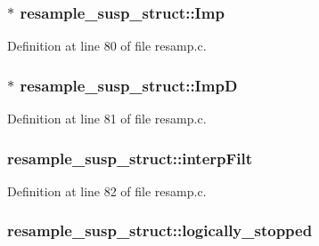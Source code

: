\subsubsection[{\texorpdfstring{Imp}{Imp}}]{$\ast$ resample\+\_\+susp\+\_\+struct\+::\+Imp}\hypertarget{structresample__susp__struct_aba6ac02376ae5614b4d20fd24f67c490}{}\label{structresample__susp__struct_aba6ac02376ae5614b4d20fd24f67c490}


Definition at line 80 of file resamp.\+c.

\subsubsection[{\texorpdfstring{ImpD}{ImpD}}]{$\ast$ resample\+\_\+susp\+\_\+struct\+::\+ImpD}\hypertarget{structresample__susp__struct_ab86d9a71cecde838eb4459e285bdbc3a}{}\label{structresample__susp__struct_ab86d9a71cecde838eb4459e285bdbc3a}


Definition at line 81 of file resamp.\+c.

\subsubsection[{\texorpdfstring{interp\+Filt}{interpFilt}}]{ resample\+\_\+susp\+\_\+struct\+::interp\+Filt}\hypertarget{structresample__susp__struct_abd525c91b0a3d9d4329e0434362f9a25}{}\label{structresample__susp__struct_abd525c91b0a3d9d4329e0434362f9a25}


Definition at line 82 of file resamp.\+c.

\subsubsection[{\texorpdfstring{logically\+\_\+stopped}{logically_stopped}}]{ resample\+\_\+susp\+\_\+struct\+::logically\+\_\+stopped}\hypertarget{structresample__susp__struct_a6f423ab6a4d2906155c8f7971a2b51da}{}\label{structresample__susp__struct_a6f423ab6a4d2906155c8f7971a2b51da}


